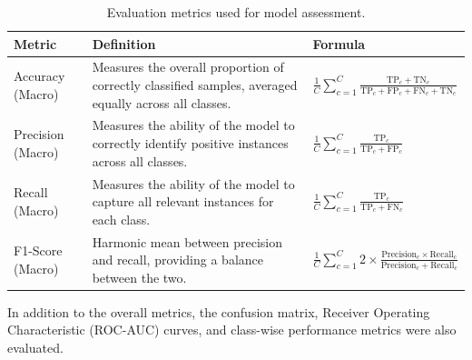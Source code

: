 \begin{table}[H]
	\centering
	\caption{Evaluation metrics used for model assessment.}
	\label{tab:tab1}
	\begin{adjustbox}{max width=0.99\textwidth}
		\begin{tabular}{p{2.5cm} p{8cm} >{\centering\arraybackslash}p{6cm}}
			\toprule
			\centering\textbf{Metric}    & \textbf{Definition}                                                                                   & \textbf{Formula} \\
			\midrule
			\centering Accuracy (Macro)  & Measures the overall proportion of correctly classified samples, averaged equally across all classes. &
			\(\displaystyle \frac{1}{C} \sum_{c=1}^{C} \frac{\text{TP}_c + \text{TN}_c}{\text{TP}_c + \text{FP}_c + \text{FN}_c + \text{TN}_c}\)                    \\

			\centering Precision (Macro) & Measures the ability of the model to correctly identify positive instances across all classes.        &
			\(\displaystyle \frac{1}{C} \sum_{c=1}^{C} \frac{\text{TP}_c}{\text{TP}_c + \text{FP}_c}\)                                                              \\

			\centering Recall (Macro)    & Measures the ability of the model to capture all relevant instances for each class.                   &
			\(\displaystyle \frac{1}{C} \sum_{c=1}^{C} \frac{\text{TP}_c}{\text{TP}_c + \text{FN}_c}\)                                                              \\

			\centering F1-Score (Macro)  & Harmonic mean between precision and recall, providing a balance between the two.                      &
			\(\displaystyle \frac{1}{C} \sum_{c=1}^{C} 2 \times \frac{\text{Precision}_c \times \text{Recall}_c}{\text{Precision}_c + \text{Recall}_c}\)            \\
			\bottomrule
		\end{tabular}
	\end{adjustbox}
\end{table}

In addition to the overall metrics, the confusion matrix, Receiver Operating
Characteristic (ROC-AUC) curves, and class-wise performance metrics were also
evaluated.
